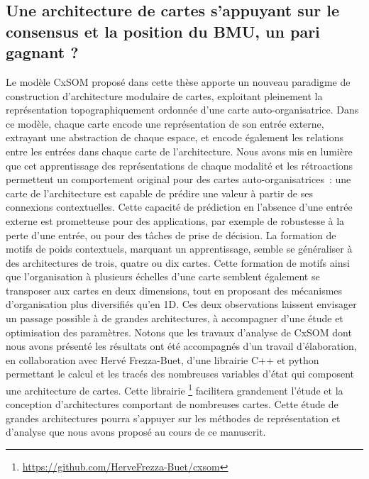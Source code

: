\subsection*{Une architecture de cartes s'appuyant sur le consensus et la position du BMU, un pari gagnant ?}

Le modèle CxSOM proposé dans cette thèse apporte un nouveau paradigme de construction d'architecture modulaire de cartes, exploitant pleinement la représentation topographiquement ordonnée d'une carte auto-organisatrice.
Dans ce modèle, chaque carte encode une représentation de son entrée externe, extrayant une abstraction de chaque espace, et encode également les relations entre les entrées dans chaque carte de l'architecture. 
Nous avons mis en lumière que cet apprentissage des représentations de chaque modalité et les rétroactions permettent un comportement original pour des cartes auto-organisatrices~: une carte de l'architecture est capable de prédire une valeur à partir de ses connexions contextuelles. Cette capacité de prédiction en l'absence d'une entrée externe est prometteuse pour des applications, par exemple de robustesse à la perte d'une entrée, ou pour des tâches de prise de décision.
La formation de motifs de poids contextuels, marquant un apprentissage, semble se généraliser à des architectures de trois, quatre ou dix cartes.
Cette formation de motifs ainsi que l'organisation à plusieurs échelles d'une carte semblent également se transposer aux cartes en deux dimensions, tout en proposant des mécanismes d'organisation plus diversifiés qu'en 1D.
Ces deux observations laissent envisager un passage possible à de grandes architectures, à accompagner d'une étude et optimisation des paramètres. 
Notons que les travaux d'analyse de CxSOM dont nous avons présenté les résultats ont été accompagnés d'un travail d'élaboration, en collaboration avec Hervé Frezza-Buet, d'une librairie C++ et python permettant le calcul et les tracés des nombreuses variables d'état qui composent une architecture de cartes.
Cette librairie \footnote{\url{https://github.com/HerveFrezza-Buet/cxsom}} facilitera grandement l'étude et la conception d'architectures comportant de nombreuses cartes.
Cette étude de grandes architectures pourra s'appuyer sur les méthodes de représentation et d'analyse que nous avons proposé au cours de ce manuscrit.


